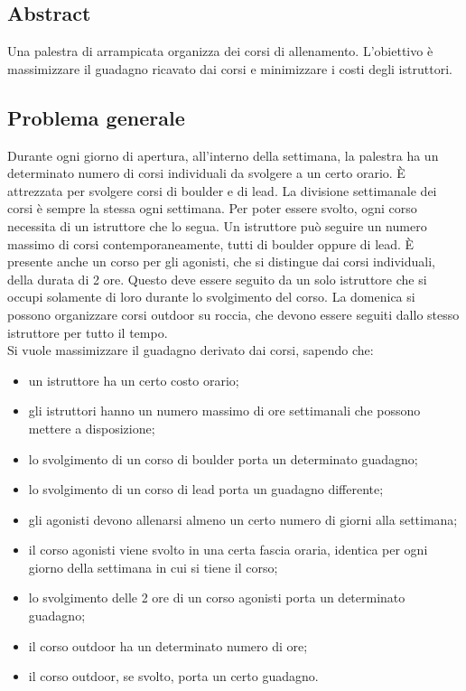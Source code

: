 \subsection{Abstract}
Una palestra di arrampicata organizza dei corsi di allenamento. L'obiettivo è massimizzare il guadagno ricavato dai corsi e minimizzare i costi degli istruttori.

\subsection{Problema generale}
Durante ogni giorno di apertura, all'interno della settimana, la palestra ha un determinato numero di corsi individuali da svolgere a un certo orario. È attrezzata per svolgere corsi di boulder e di lead. La divisione settimanale dei corsi è sempre la stessa ogni settimana. Per poter essere svolto, ogni corso necessita di un istruttore che lo segua. Un istruttore può seguire un numero massimo di corsi contemporaneamente, tutti di boulder oppure di lead. È presente anche un corso per gli agonisti, che si distingue dai corsi individuali, della durata di 2 ore. Questo deve essere seguito da un solo istruttore che si occupi solamente di loro durante lo svolgimento del corso. La domenica si possono organizzare corsi outdoor su roccia, che devono essere seguiti dallo stesso istruttore per tutto il tempo. \\
Si vuole massimizzare il guadagno derivato dai corsi, sapendo che:
\begin{itemize}
	\item un istruttore ha un certo costo orario;
	\item gli istruttori hanno un numero massimo di ore settimanali che possono mettere a disposizione;
	\item lo svolgimento di un corso di boulder porta un determinato guadagno;
	\item lo svolgimento di un corso di lead porta un guadagno differente;
	\item gli agonisti devono allenarsi almeno un certo numero di giorni alla settimana;
	\item il corso agonisti viene svolto in una certa fascia oraria, identica per ogni giorno della settimana in cui si tiene il corso;
	\item lo svolgimento delle 2 ore di un corso agonisti porta un determinato guadagno;
	\item il corso outdoor ha un determinato numero di ore;
	\item il corso outdoor, se svolto, porta un certo guadagno.
\end{itemize}
